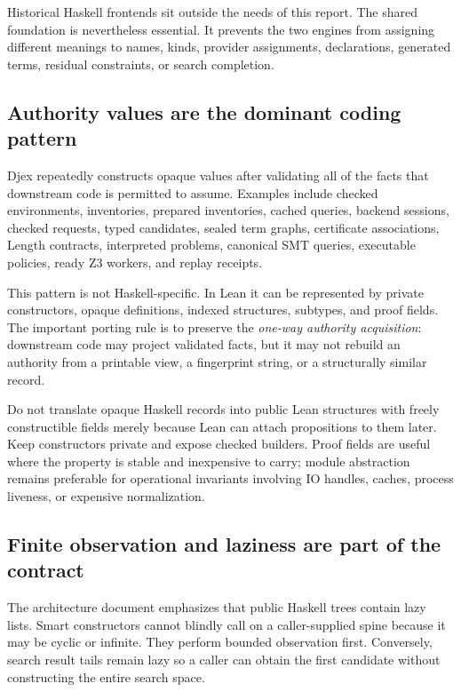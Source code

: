 \documentclass[10pt,letterpaper,oneside]{report}
\newcommand{\code}[1]{\texttt{\detokenize{#1}}}
\begin{document}
Historical Haskell frontends sit outside the needs of this report. The shared foundation is nevertheless essential. It prevents the two engines from assigning different meanings to names, kinds, provider assignments, declarations, generated terms, residual constraints, or search completion.

\subsection{Authority values are the dominant coding pattern}

Djex repeatedly constructs opaque values after validating all of the facts that downstream code is permitted to assume. Examples include checked environments, inventories, prepared inventories, cached queries, backend sessions, checked requests, typed candidates, sealed term graphs, certificate associations, Length contracts, interpreted problems, canonical SMT queries, executable policies, ready Z3 workers, and replay receipts.

This pattern is not Haskell-specific. In Lean it can be represented by private constructors, opaque definitions, indexed structures, subtypes, and proof fields. The important porting rule is to preserve the \emph{one-way authority acquisition}: downstream code may project validated facts, but it may not rebuild an authority from a printable view, a fingerprint string, or a structurally similar record.

\begin{designbox}
Do not translate opaque Haskell records into public Lean structures with freely constructible fields merely because Lean can attach propositions to them later. Keep constructors private and expose checked builders. Proof fields are useful where the property is stable and inexpensive to carry; module abstraction remains preferable for operational invariants involving IO handles, caches, process liveness, or expensive normalization.
\end{designbox}

\subsection{Finite observation and laziness are part of the contract}

The architecture document emphasizes that public Haskell trees contain lazy lists. Smart constructors cannot blindly call \code{length} on a caller-supplied spine because it may be cyclic or infinite. They perform bounded observation first. Conversely, search result tails remain lazy so a caller can obtain the first candidate without constructing the entire search space.
\end{document}
